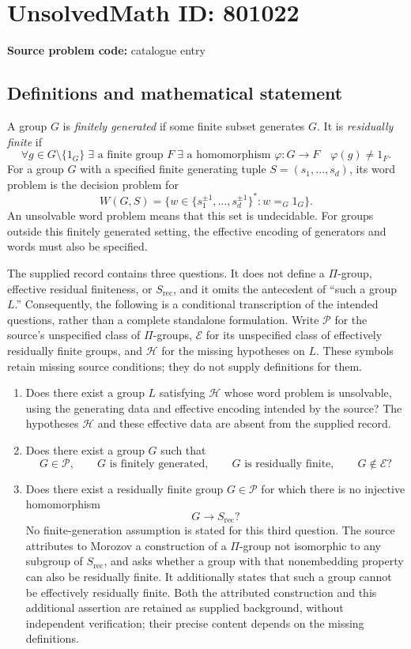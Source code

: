 \documentclass[11pt]{article}
\begin{document}
\section*{UnsolvedMath ID: 801022}
\textbf{Source problem code:} catalogue entry
\subsection{Definitions and mathematical statement}
A group \(G\) is \emph{finitely generated} if some finite subset generates \(G\). It is \emph{residually finite} if
\[
\forall g\in G\setminus\{1_G\}\;\exists\text{ a finite group }F\;\exists\text{ a homomorphism }\varphi:G\to F\quad \varphi(g)\ne 1_F.
\]
For a group \(G\) with a specified finite generating tuple \(S=(s_1,\ldots,s_d)\), its word problem is the decision problem for
\[
W(G,S)=\{w\in\{s_1^{\pm1},\ldots,s_d^{\pm1}\}^{*}:w=_G1_G\}.
\]
An unsolvable word problem means that this set is undecidable. For groups outside this finitely generated setting, the effective encoding of generators and words must also be specified.

The supplied record contains three questions. It does not define a \(\Pi\)-group, effective residual finiteness, or \(S_{\mathrm{rec}}\), and it omits the antecedent of ``such a group \(L\).'' Consequently, the following is a conditional transcription of the intended questions, rather than a complete standalone formulation. Write \(\mathcal P\) for the source's unspecified class of \(\Pi\)-groups, \(\mathcal E\) for its unspecified class of effectively residually finite groups, and \(\mathcal H\) for the missing hypotheses on \(L\). These symbols retain missing source conditions; they do not supply definitions for them.
\begin{enumerate}
\item Does there exist a group \(L\) satisfying \(\mathcal H\) whose word problem is unsolvable, using the generating data and effective encoding intended by the source? The hypotheses \(\mathcal H\) and these effective data are absent from the supplied record.
\item Does there exist a group \(G\) such that
\[
G\in\mathcal P,\qquad G\text{ is finitely generated},\qquad G\text{ is residually finite},\qquad G\notin\mathcal E?
\]
\item Does there exist a residually finite group \(G\in\mathcal P\) for which there is no injective homomorphism
\[
G\longrightarrow S_{\mathrm{rec}}?
\]
No finite-generation assumption is stated for this third question. The source attributes to Morozov a construction of a \(\Pi\)-group not isomorphic to any subgroup of \(S_{\mathrm{rec}}\), and asks whether a group with that nonembedding property can also be residually finite. It additionally states that such a group cannot be effectively residually finite. Both the attributed construction and this additional assertion are retained as supplied background, without independent verification; their precise content depends on the missing definitions.
\end{enumerate}
\end{document}
